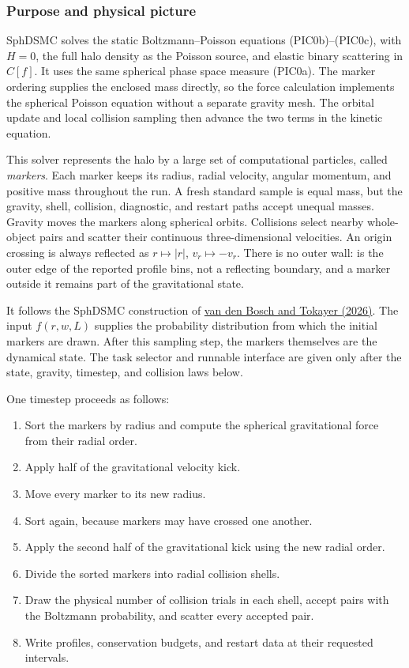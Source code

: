 \subsubsection{Purpose and physical picture}

SphDSMC solves the static Boltzmann--Poisson equations (PIC0b)--(PIC0c), with
\(H=0\), the full halo density as the Poisson source, and elastic binary
scattering in \(C[f]\).  It uses the same spherical phase space measure
(PIC0a).  The marker ordering supplies the enclosed mass directly, so the
force calculation implements the spherical Poisson equation without a
separate gravity mesh.  The orbital update and local collision sampling then
advance the two terms in the kinetic equation.

This solver represents the halo by a large set of computational
particles, called \emph{markers}.  Each marker keeps its radius, radial
velocity, angular momentum, and positive mass throughout the run.  A fresh
standard sample is equal mass, but the gravity, shell, collision, diagnostic,
and restart paths accept unequal masses.  Gravity moves the markers along
spherical orbits.  Collisions select nearby whole-object pairs and scatter
their continuous three-dimensional velocities.
An origin crossing is always reflected as
\(r\mapsto|r|\), \(v_r\mapsto-v_r\).  There is no outer wall: 
is the outer edge of the reported profile bins, not a reflecting boundary,
and a marker outside it remains part of the gravitational state.

It follows the SphDSMC construction of
\href{https://doi.org/10.1093/mnras/stag2015}{van den Bosch and Tokayer (2026)}.
The input \(f(r,w,L)\) supplies the probability distribution from which the
initial markers are drawn.  After this sampling step, the markers themselves
are the dynamical state.  The task selector and runnable interface are given
only after the state, gravity, timestep, and collision laws below.

One timestep proceeds as follows:
\begin{enumerate}
\item Sort the markers by radius and compute the spherical gravitational
      force from their radial order.
\item Apply half of the gravitational velocity kick.
\item Move every marker to its new radius.
\item Sort again, because markers may have crossed one another.
\item Apply the second half of the gravitational kick using the new radial
      order.
\item Divide the sorted markers into radial collision shells.
\item Draw the physical number of collision trials in each shell, accept
      pairs with the Boltzmann probability, and scatter every accepted pair.
\item Write profiles, conservation budgets, and restart data at their
      requested intervals.
\end{enumerate}

